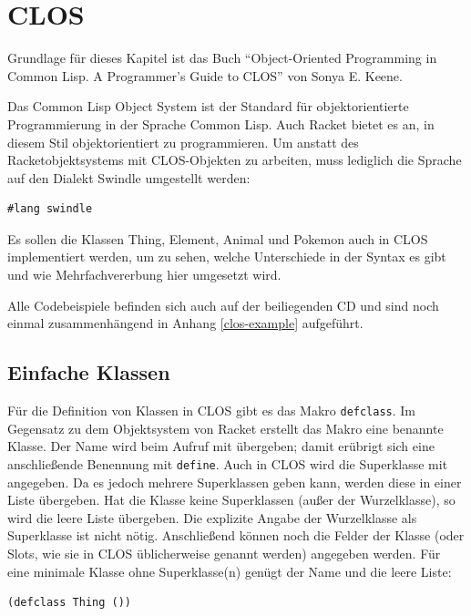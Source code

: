 \section{CLOS}
Grundlage für dieses Kapitel ist das Buch ``Object-Oriented Programming in Common Lisp. A Programmer's Guide to CLOS'' \cite{keene} von Sonya E. Keene. 

Das Common Lisp Object System ist der Standard für objektorientierte Programmierung in der Sprache Common Lisp. Auch Racket bietet es an, in diesem Stil objektorientiert zu programmieren. Um anstatt des Racketobjektsystems mit CLOS-Objekten zu arbeiten, muss lediglich die Sprache auf den Dialekt Swindle umgestellt werden:


\begin{lstlisting}
#lang swindle
\end{lstlisting}

Es sollen die Klassen Thing, Element, Animal und Pokemon auch in CLOS implementiert werden, um zu sehen, welche Unterschiede in der Syntax es gibt und wie Mehrfachvererbung hier umgesetzt wird. 

Alle Codebeispiele befinden sich auch auf der beiliegenden CD und sind noch einmal zusammenhängend in Anhang \ref{clos-example} aufgeführt.

\subsection{Einfache Klassen}
Für die Definition von Klassen in CLOS gibt es das Makro \texttt{defclass}. Im Gegensatz zu dem Objektsystem von Racket erstellt das Makro eine benannte Klasse. Der Name wird beim Aufruf mit übergeben; damit erübrigt sich eine anschließende Benennung mit \texttt{define}. Auch in CLOS wird die Superklasse mit angegeben. Da es jedoch mehrere Superklassen geben kann, werden diese in einer Liste übergeben. Hat die Klasse keine Superklassen (außer der Wurzelklasse), so wird die leere Liste übergeben. Die explizite Angabe der Wurzelklasse als Superklasse ist nicht nötig. Anschließend können noch die Felder der Klasse (oder Slots, wie sie in CLOS üblicherweise genannt werden) angegeben werden. Für eine minimale Klasse ohne Superklasse(n) genügt der Name und die leere Liste: 

\begin{lstlisting}
(defclass Thing ())
\end{lstlisting}


